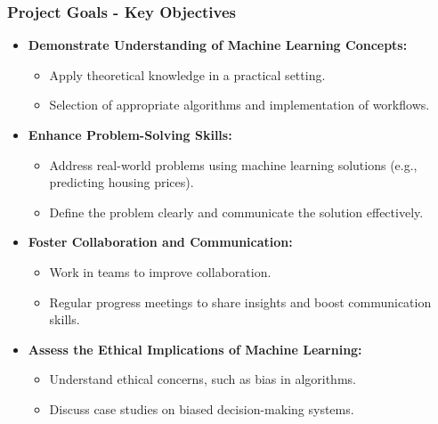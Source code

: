 \documentclass[aspectratio=169]{beamer}
\begin{document}
\begin{frame}[fragile]
    \frametitle{Project Goals - Key Objectives}
    \begin{itemize}
        \item \textbf{Demonstrate Understanding of Machine Learning Concepts:}
        \begin{itemize}
            \item Apply theoretical knowledge in a practical setting.
            \item Selection of appropriate algorithms and implementation of workflows.
        \end{itemize}

        \item \textbf{Enhance Problem-Solving Skills:}
        \begin{itemize}
            \item Address real-world problems using machine learning solutions (e.g., predicting housing prices).
            \item Define the problem clearly and communicate the solution effectively.
        \end{itemize}

        \item \textbf{Foster Collaboration and Communication:}
        \begin{itemize}
            \item Work in teams to improve collaboration.
            \item Regular progress meetings to share insights and boost communication skills.
        \end{itemize}

        \item \textbf{Assess the Ethical Implications of Machine Learning:}
        \begin{itemize}
            \item Understand ethical concerns, such as bias in algorithms.
            \item Discuss case studies on biased decision-making systems.
        \end{itemize}
    \end{itemize}
\end{frame}
\end{document}
